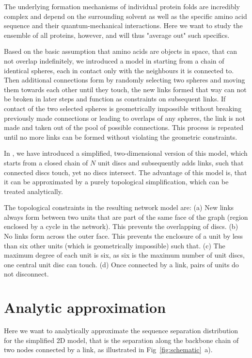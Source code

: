 \documentclass[reprint,amsmath,amssymb,rmp,onecolumn,notitlepage,11pt]{revtex4-1}
\begin{document}
The underlying formation mechanisms of individual protein folds are incredibly complex and depend on the surrounding solvent as well as the specific amino acid sequence and their quantum-mechanical interactions. Here we want to study the ensemble of all proteins, however, and will thus "average out" such specifics.

Based on the basic assumption that amino acids are objects in space, that can not overlap indefinitely, we introduced a model in \cite{molkenthin2020self} starting from a chain of identical spheres, each in contact only with the neighbours it is connected to. Then additional connections form by randomly selecting two spheres and moving them towards each other until they touch, the new links formed that way can not be broken in later steps and function as constraints on subsequent links. If contact of the two selected spheres is geometrically impossible without breaking previously made connections or leading to overlaps of any spheres, the link is not made and taken out of the pool of possible connections. This process is repeated until no more links can be formed without violating the geometric constraints.

In \cite{molkenthin2016scaling}, we have introduced a simplified, two-dimensional version of this model, which starts from a closed chain of $N$ unit discs and subsequently adds links, such that connected discs touch, yet no discs intersect. The advantage of this model is, that it can be approximated by a purely topological simplification, which can be treated analytically.

The topological constraints in the resulting network model are:
(a) New links always form between two units that are part of the same face of the graph (region enclosed by a cycle in the network). This prevents the overlapping of discs. (b) No links form across the outer face. This prevents the enclosure of a unit by less than six other units (which is geometrically impossible) such that. (c) The maximum degree of each unit is six, as six is the maximum number of unit discs, one central unit disc can touch. (d) Once connected by a link, pairs of units do not disconnect.

\section*{Analytic approximation}
Here we want to analytically approximate the sequence separation distribution for the simplified 2D model, that is the separation along the backbone chain of two nodes connected by a link, as illustrated in Fig~\ref{fig:schematic}~a).
\end{document}
